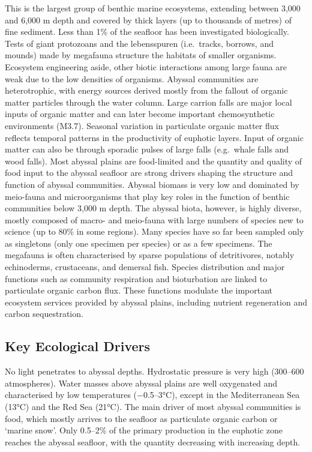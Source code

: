 \documentclass[
  letterpaper,
  DIV=11,
  numbers=noendperiod]{scrartcl}
\begin{document}
This is the largest group of benthic marine ecosystems, extending
between 3,000 and 6,000 m depth and covered by thick layers (up to
thousands of metres) of fine sediment. Less than 1\% of the seafloor has
been investigated biologically. Tests of giant protozoans and the
lebensspuren (i.e.~tracks, borrows, and mounds) made by megafauna
structure the habitats of smaller organisms. Ecosystem engineering
aside, other biotic interactions among large fauna are weak due to the
low densities of organisms. Abyssal communities are heterotrophic, with
energy sources derived mostly from the fallout of organic matter
particles through the water column. Large carrion falls are major local
inputs of organic matter and can later become important chemosynthetic
environments (M3.7). Seasonal variation in particulate organic matter
flux reflects temporal patterns in the productivity of euphotic layers.
Input of organic matter can also be through sporadic pulses of large
falls (e.g.~whale falls and wood falls). Most abyssal plains are
food-limited and the quantity and quality of food input to the abyssal
seafloor are strong drivers shaping the structure and function of
abyssal communities. Abyssal biomass is very low and dominated by
meio-fauna and microorganisms that play key roles in the function of
benthic communities below 3,000 m depth. The abyssal biota, however, is
highly diverse, mostly composed of macro- and meio-fauna with large
numbers of species new to science (up to 80\% in some regions). Many
species have so far been sampled only as singletons (only one specimen
per species) or as a few specimens. The megafauna is often characterised
by sparse populations of detritivores, notably echinoderms, crustaceans,
and demersal fish. Species distribution and major functions such as
community respiration and bioturbation are linked to particulate organic
carbon flux. These functions modulate the important ecosystem services
provided by abyssal plains, including nutrient regeneration and carbon
sequestration.

\subsection{Key Ecological Drivers}\label{key-ecological-drivers-42}

No light penetrates to abyssal depths. Hydrostatic pressure is very high
(300--600 atmospheres). Water masses above abyssal plains are well
oxygenated and characterised by low temperatures (−0.5--3°C), except in
the Mediterranean Sea (13°C) and the Red Sea (21°C). The main driver of
most abyssal communities is food, which mostly arrives to the seafloor
as particulate organic carbon or `marine snow'. Only 0.5--2\% of the
primary production in the euphotic zone reaches the abyssal seafloor,
with the quantity decreasing with increasing depth.
\end{document}
